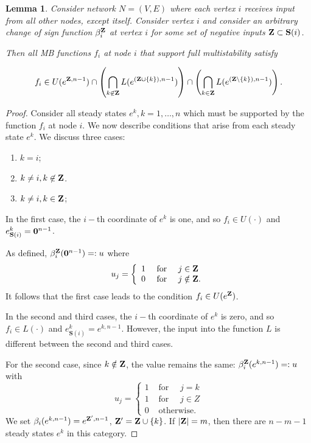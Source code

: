 \documentclass[12pt]{amsart}
\newcommand{\bZ}{{\bf Z}}
\newcommand{\bzero}{{\bf 0}}
\newcommand{\Sources}{\mathbf{S}}
\newtheorem{lem}[thm]{Lemma}
\theoremstyle{definition}
\begin{document}
\begin{lem} \label{lem:ULform}
    Consider network $N=(V,E)$ where each vertex $i$ receives input from all other nodes, except itself.
    Consider vertex $i$ and consider an arbitrary change of sign function $\beta_i^{\bZ}$ at vertex $i$ for some set of negative inputs $\bZ \subset \Sources(i)$.
    
    Then all MB functions $f_i$ at node $i$ that support full multistability satisfy
    
    \[ f_i \in U(e^{\bZ,n-1})\cap \left( \bigcap_{k \not \in \bZ} L(e^{(\bZ\cup \{k\}),n-1}) \right)\cap \left(\bigcap_{k\in \bZ} L(e^{(\bZ\setminus \{k\}),n-1})\right).\]
\end{lem}
\begin{proof}
Consider all steady states $e^k, k=1, \ldots, n$ which must be supported by the function $f_i$ at node $i$. We now describe conditions that arise from each steady state $e^k$.
We discuss three cases:
\begin{enumerate}
\item $k=i$;
\item $k\not =i, k\not \in \bZ$.
\item $k\not =i, k\in \bZ$;
\end{enumerate}
In the first case, the $i-$th coordinate of $e^k$ is one, and so $f_i\in U(\cdot)$ and $e^k_{\Sources(i)} = \bzero^{n-1}$.

As defined, $\beta_{i}^\bZ(\bzero^{n-1})=: u$ where
\[
  u_j=\left \{ \begin{array}{cl}
1 & \mbox{ for }\quad j \in \bZ \\
0 & \mbox{ for } \quad j \notin \bZ.
\end{array}
\right.
\]
It follows that the first case leads to the condition $f_i\in U(e^{\bZ})$.

In the second and third cases, the $i-$th coordinate of $e^k$ is zero, and so $f_i\in L(\cdot)$ and $e^k_{\Sources(i)} = e^{k,n-1}$. However, the input into the function $L$ is different between the second and third cases.

For the second case, since $k\notin \bZ$, the value remains the same: $\beta_{i}^\bZ(e^{k,n-1}) =: u$ with 
\[
u_j=\left \{ \begin{array}{cl}
1 & \mbox{ for }\quad j = k \\
1 & \mbox{ for }\quad j \in Z \\
0 & \mbox{ otherwise.}
\end{array}
\right.
\]
We set $\beta_{i}(e^{k,n-1}) = e^{\bZ^\prime,n-1}$, $\bZ^\prime = \bZ \cup \{k\} $.
If $|\bZ|=m$, then there are $n-m-1$ steady states $e^k$ in this category.



\end{proof}
\end{document}
